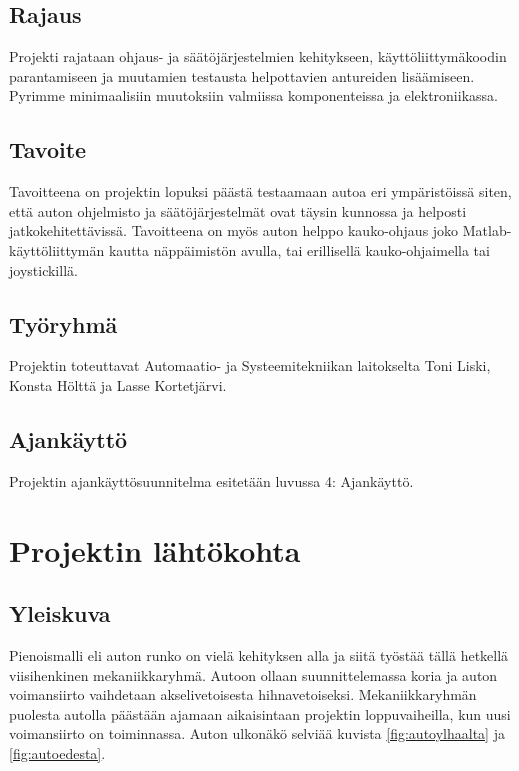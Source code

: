 \documentclass{article}
\begin{document}
\subsection{Rajaus}

Projekti rajataan ohjaus- ja säätöjärjestelmien kehitykseen, käyttöliittymäkoodin parantamiseen ja muutamien testausta helpottavien antureiden lisäämiseen. Pyrimme minimaalisiin muutoksiin valmiissa komponenteissa ja elektroniikassa.

\subsection{Tavoite}

Tavoitteena on projektin lopuksi päästä testaamaan autoa eri ympäristöissä siten, että auton ohjelmisto ja säätöjärjestelmät ovat täysin kunnossa ja helposti jatkokehitettävissä. Tavoitteena on myös auton helppo kauko-ohjaus joko Matlab-käyttöliittymän kautta näppäimistön avulla, tai erillisellä kauko-ohjaimella tai joystickillä.

\subsection{Työryhmä}

Projektin toteuttavat Automaatio- ja Systeemitekniikan laitokselta Toni Liski, Konsta Hölttä ja Lasse Kortetjärvi.

\subsection{Ajankäyttö}

Projektin ajankäyttösuunnitelma esitetään luvussa 4: Ajankäyttö.

\section{Projektin lähtökohta}

\subsection{Yleiskuva}

Pienoismalli eli auton runko on vielä kehityksen alla ja siitä työstää tällä hetkellä viisihenkinen mekaniikkaryhmä. Autoon ollaan suunnittelemassa koria ja auton voimansiirto vaihdetaan akselivetoisesta hihnavetoiseksi. Mekaniikkaryhmän puolesta autolla päästään ajamaan aikaisintaan projektin loppuvaiheilla, kun uusi voimansiirto on toiminnassa. Auton ulkonäkö selviää kuvista \ref{fig:autoylhaalta} ja \ref{fig:autoedesta}.
\end{document}
